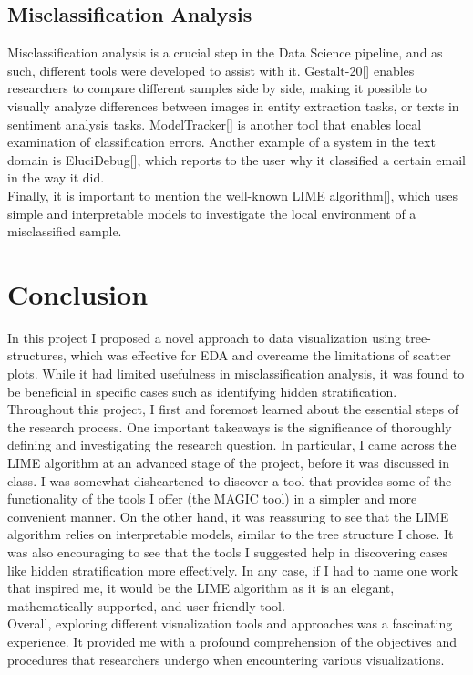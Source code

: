 \documentclass[11pt]{article}
\begin{document}
\subsection{Misclassification Analysis}\label{Misclassification Analysis
}
Misclassification analysis is a crucial step in the Data Science pipeline, and as such, different tools were developed to assist with it. Gestalt-20[] enables researchers to compare different samples side by side, making it possible to visually analyze differences between images in entity extraction tasks, or texts in sentiment analysis tasks. ModelTracker[] is another tool that enables local examination of classification errors.
Another example of a system in the text domain is EluciDebug[], which reports to the user why it classified a certain email in the way it did.\\
Finally, it is important to mention the well-known LIME algorithm[], which uses simple and interpretable models to investigate the local environment of a misclassified sample.
\section{Conclusion}\label{Conclusion}
In this project I proposed a novel approach to data visualization using tree-structures, which was effective for EDA and overcame the limitations of scatter plots. While it had limited usefulness in misclassification analysis, it was found to be beneficial in specific cases such as identifying hidden stratification.\\
Throughout this project, I first and foremost learned about the essential steps of the research process. One important takeaways is the significance of thoroughly defining and investigating the research question. In particular, I came across the LIME algorithm at an advanced stage of the project, before it was discussed in class. I was somewhat disheartened to discover a tool that provides some of the functionality of the tools I offer (the MAGIC tool) in a simpler and more convenient manner. On the other hand, it was reassuring to see that the LIME algorithm relies on interpretable models, similar to the tree structure I chose. It was also encouraging to see that the tools I suggested help in discovering cases like hidden stratification more effectively. In any case, if I had to name one work that inspired me, it would be the LIME algorithm as it is an elegant, mathematically-supported, and user-friendly tool.\\
Overall, exploring different visualization tools and approaches was a fascinating experience. It provided me with a profound comprehension of the objectives and procedures that researchers undergo when encountering various visualizations.


\end{document}
